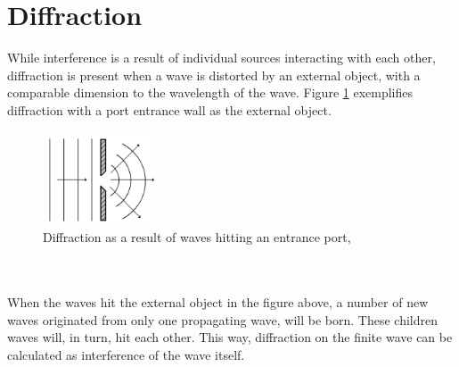 \section{Diffraction} \label{sec:diffraction}
While interference is a result of individual sources interacting with each other, diffraction is present when a wave is distorted by an external object, with a comparable dimension to the wavelength of the wave. Figure \ref{fig:diffraction} exemplifies diffraction with a port entrance wall as the external object. 
\begin{figure}[h]
    \centering
    \includegraphics[width=0.3\textwidth]{Images/theory/diffraction.png}
    \caption[Diffraction]{Diffraction as a result of waves hitting an entrance port, \cite{sigernes2018}}
    \label{fig:diffraction}
\end{figure}
\\\\
When the waves hit the external object in the figure above, a number of new waves originated from only one propagating wave, will be born. These children waves will, in turn, hit each other. This way, diffraction on the finite wave can be calculated as interference of the wave itself.


